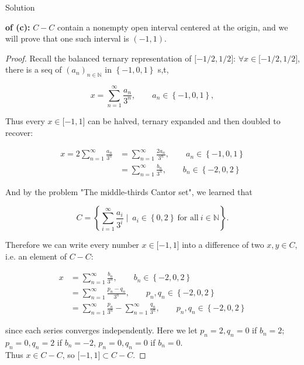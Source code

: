 \begin{qlsolution}{Solution}

\textbf{of (c):} \(C - C\) contain a nonempty open interval centered at the origin, and we will prove that one such interval is \(( - 1,1)\).

\begin{proof}

Recall the balanced ternary representation of \(\lbrack - 1/2,1/2\rbrack\): \(\forall x \in \lbrack - 1/2,1/2\rbrack\), there is a seq of \((a_{n})_{n \in \mathbb{N}}\) in \(\left\{ {- 1,0,1} \right\}\) s,t,

\[x = \sum\limits_{n = 1}^{\infty}\frac{a_{n}}{3^{n}},\qquad a_{n} \in \left\{ {- 1,0,1} \right\},\]

Thus every \(x \in \lbrack - 1,1\rbrack\) can be halved, ternary expanded and then doubled to recover:

\[\begin{matrix}
{x = 2\sum\limits_{n = 1}^{\infty}\frac{a_{n}}{3^{n}}} & {= \sum\limits_{n = 1}^{\infty}\frac{2a_{n}}{3^{n}},\qquad a_{n} \in \left\{ {- 1,0,1} \right\}} \\
 & {= \sum\limits_{n = 1}^{\infty}\frac{b_{n}}{3^{n}},\qquad b_{n} \in \left\{ {- 2,0,2} \right\}}
\end{matrix}\]

And by the problem "The middle-thirds Cantor set", we learned that

\[C = \left\{ {\sum\limits_{i = 1}^{\infty}\frac{a_{i}}{3^{i}} \mid \ a_{i} \in \left\{ {0,2} \right\}\ \text{for all}\ i \in \mathbb{N}} \right\}.\]

Therefore we can write every number \(x \in \lbrack - 1,1\rbrack\) into a difference of two \(x,y \in C\), i.e. an element of \(C - C\):

\[\begin{matrix}
x & {= \sum\limits_{n = 1}^{\infty}\frac{b_{n}}{3^{n}},\qquad b_{n} \in \left\{ {- 2,0,2} \right\}} \\
 & {= \sum\limits_{n = 1}^{\infty}\frac{p_{n} - q_{n}}{3^{n}},\qquad p_{n},q_{n} \in \left\{ {- 2,0,2} \right\}} \\
 & {= \sum\limits_{n = 1}^{\infty}\frac{p_{n}}{3^{n}} - \sum\limits_{n = 1}^{\infty}\frac{q_{n}}{3^{n}},\qquad p_{n},q_{n} \in \left\{ {- 2,0,2} \right\}}
\end{matrix}\]

since each series converges independently. Here we let \(p_{n} = 2,q_{n} = 0\) if \(b_{n} = 2\); \(p_{n} = 0,q_{n} = 2\) if \(b_{n} = - 2\), \(p_{n} = 0,q_{n} = 0\) if \(b_{n} = 0\).\\
Thus \(x \in C - C\), so \(\lbrack - 1,1\rbrack \subset C - C\).

\end{proof}

\end{qlsolution}

